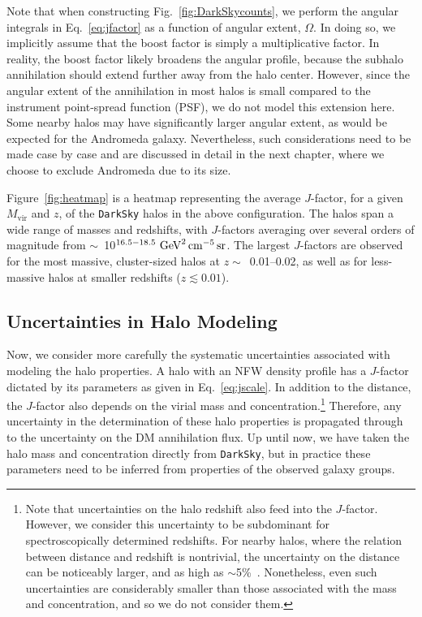 Note that when constructing Fig.~\ref{fig:DarkSkycounts}, we perform the angular integrals in Eq.~\ref{eq:jfactor} as a function of angular extent, $\Omega$.  In doing so, we implicitly assume that the boost factor is simply a multiplicative factor.  In reality, the boost factor likely broadens the angular profile, because the subhalo annihilation should extend further away from the halo center. However, since the angular extent of the annihilation in most halos is small compared to the instrument point-spread function (PSF), we do not model this extension here. Some nearby halos may have significantly larger angular extent, as would be expected for the Andromeda galaxy. Nevertheless, such considerations need to be made case by case and are discussed in detail in the next chapter, where we choose to exclude Andromeda due to its size.

Figure~\ref{fig:heatmap} is a heatmap representing the average $J$-factor, for a given $M_\text{vir}$ and $z$, of the \texttt{DarkSky} halos in the above configuration.  The halos span a wide range of masses and redshifts, with $J$-factors averaging over several orders of magnitude from $\sim$~10$^{16.5-18.5}~{\rm GeV}^2\,{\rm cm}^{-5}\,{\rm sr}$.     
The largest $J$-factors are observed for the most massive, cluster-sized halos at $z \sim $~0.01--0.02, as well as for less-massive halos at smaller redshifts ($z \lesssim 0.01$). 

\subsection{Uncertainties in Halo Modeling}
\label{sec:uncertainties}

Now, we consider more carefully the systematic uncertainties associated with modeling the halo properties.  
A halo with an NFW density profile has a $J$-factor dictated by its parameters as given in Eq.~\ref{eq:jscale}.  In addition to the distance, the $J$-factor also depends on the virial mass and concentration.\footnote{Note that uncertainties on the halo redshift also feed into the $J$-factor.  However, we consider this uncertainty to be subdominant for spectroscopically determined redshifts. For nearby halos, where the relation between distance and redshift is nontrivial, the uncertainty on the distance can be noticeably larger, and as high as $\sim$5\%~\cite{Tully:2016ppz}. Nonetheless, even such uncertainties are considerably smaller than those associated with the mass and concentration, and so we do not consider them.}  
  Therefore, any uncertainty in the determination of these halo properties is propagated through to the uncertainty on the DM annihilation flux.  Up until now, we have taken the halo mass and concentration directly from \texttt{DarkSky}, but in practice these parameters need to be inferred from properties of the observed galaxy groups.
 
